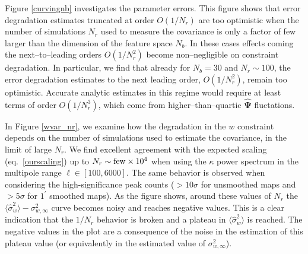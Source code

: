 \documentclass[reprint,aps,prd,superscriptaddress,showkeys,showpacs]{revtex4-1}
\newcommand{\bbh}[1]{\mathbf{\hat{#1}}}
\begin{document}
Figure \ref{curvingnb} investigates the parameter errors. This figure
shows that error degradation estimates truncated at order $O(1/N_r)$
are too optimistic when the number of simulations $N_r$ used to
measure the covariance is only a factor of few larger than the
dimension of the feature space $N_b$. In these cases effects coming
the next--to--leading orders $O(1/N_r^2)$ become non--negligible on
constraint degradation. In particular, we find that already for
$N_b=30$ and $N_r\sim100$, the error degradation estimates to the next
leading order, $O(1/N_r^2)$, remain too optimistic. Accurate analytic
estimates in this regime would require at least terms of order
$O(1/N_r^3)$, which come from higher--than--quartic $\bbh{\Psi}$
fluctations.

In Figure \ref{wvar_nr}, we examine how the degradation in the $w$
constraint depends on the number of simulations used to estimate the
covariance, in the limit of large $N_r$. We find excellent agreement
with the expected scaling (eq.~\ref{ourscaling}) up to $N_r\sim {\rm few}\times10^4$ when using the $\kappa$ power spectrum in the multipole range $\ell\in[100,6000]$. The same behavior is observed when considering the high-significance peak counts ($>10\sigma$ for unsmoothed maps and $>5\sigma$ for $1^\prime$ smoothed maps). As the figure shows, around these values of $N_r$ the $\langle\hat{\sigma}^2_w\rangle - \sigma^2_{w,\infty}$ curve
becomes noisy and reaches negative values. This is a clear indication that the $1/N_r$ behavior is broken and a plateau in
$\langle\hat{\sigma}^2_w\rangle$ is reached. The negative values in
the plot are a consequence of the noise in the estimation of this
plateau value (or equivalently in the estimated value of
$\sigma^2_{w,\infty}$). 
\end{document}
